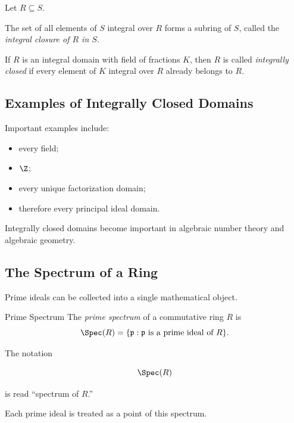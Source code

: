 Let \(R\subseteq S\).

The set of all elements of \(S\) integral over \(R\) forms a subring of
\(S\), called the \emph{integral closure of \(R\) in \(S\)}.

If \(R\) is an integral domain with field of fractions \(K\), then \(R\) is
called \emph{integrally closed} if every element of \(K\) integral over \(R\)
already belongs to \(R\).

\subsection{Examples of Integrally Closed Domains}
\label{subsec:integrally-closed-examples}

Important examples include:

\begin{itemize}
    \item every field;
    \item \(\Z\);
    \item every unique factorization domain;
    \item therefore every principal ideal domain.
\end{itemize}

Integrally closed domains become important in algebraic number theory and
algebraic geometry.

\subsection{The Spectrum of a Ring}
\label{subsec:ring-spectrum}

Prime ideals can be collected into a single mathematical object.

\begin{definitionbox}{Prime Spectrum}
The \emph{prime spectrum} of a commutative ring \(R\) is
\[ \Spec(R)=\{\mathfrak p:\mathfrak p\text{ is a prime ideal of }R\}. \]
\end{definitionbox}

The notation

\[ \Spec(R) \]

is read ``spectrum of \(R\).''

Each prime ideal is treated as a point of this spectrum.

